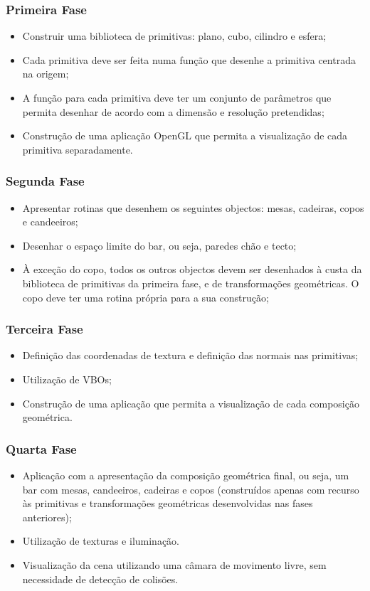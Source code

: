 \documentclass[a5paper,onecolumn, 11pt]{article}
\begin{document}
\subsubsection{Primeira Fase}
\begin{itemize}
    \item{Construir uma biblioteca de primitivas: plano, cubo, cilindro e esfera;}
    \item{Cada primitiva deve ser feita numa função que desenhe a primitiva centrada na origem;}
    \item{A função para cada primitiva deve ter um conjunto de parâmetros que permita desenhar de acordo com a dimensão e resolução pretendidas;}
    \item{Construção de uma aplicação OpenGL que permita a visualização de cada primitiva separadamente.}
\end{itemize}
\newpage
\subsubsection{Segunda Fase}
\begin{itemize}
    \item{Apresentar rotinas que desenhem os seguintes objectos: mesas, cadeiras, copos e candeeiros;}
    \item{Desenhar o espaço limite do bar, ou seja, paredes chão e tecto;}
    \item{À exceção do copo, todos os outros objectos devem ser desenhados à custa da biblioteca de primitivas da primeira fase, e de transformações geométricas. O copo deve ter uma rotina própria para a sua construção;}
\end{itemize}
\subsubsection{Terceira Fase}
\begin{itemize}
    \item{Definição das coordenadas de textura e definição das normais nas primitivas;}
    \item{Utilização de VBOs;}
    \item{Construção de  uma aplicação que permita a visualização de cada composição geométrica.} 
\end{itemize}
\newpage
\subsubsection{Quarta Fase}
\begin{itemize}
    \item{Aplicação com a apresentação da composição geométrica final, ou seja, um bar com mesas, candeeiros, cadeiras e copos (construídos apenas com recurso às primitivas e transformações geométricas desenvolvidas nas fases anteriores);}
    \item{Utilização de texturas e iluminação.}
    \item{Visualização da cena utilizando uma câmara de movimento livre, sem necessidade de detecção de colisões.}
\end{itemize}
\newpage
\end{document}
